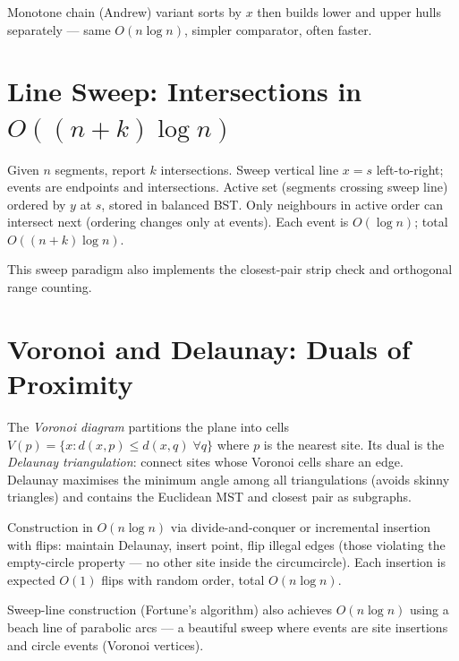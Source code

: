 Monotone chain (Andrew) variant sorts by $x$ then builds lower and upper hulls separately --- same $O(n\log n)$, simpler comparator, often faster.

\section{\texorpdfstring{Line Sweep: Intersections in $O((n+k)\log n)$}{Line Sweep: Intersections in O((n+k) log n)}}
\label{sec:sweep}

Given $n$ segments, report $k$ intersections. Sweep vertical line $x=s$ left-to-right; events are endpoints and intersections. Active set (segments crossing sweep line) ordered by $y$ at $s$, stored in balanced BST. Only neighbours in active order can intersect next (ordering changes only at events). Each event is $O(\log n)$; total $O((n+k)\log n)$.

This sweep paradigm also implements the closest-pair strip check and orthogonal range counting.

\section{Voronoi and Delaunay: Duals of Proximity}
\label{sec:voronoi}

The \emph{Voronoi diagram} partitions the plane into cells $V(p)=\{x: d(x,p)\le d(x,q)\;\forall q\}$ where $p$ is the nearest site. Its dual is the \emph{Delaunay triangulation}: connect sites whose Voronoi cells share an edge. Delaunay maximises the minimum angle among all triangulations (avoids skinny triangles) and contains the Euclidean MST and closest pair as subgraphs.

Construction in $O(n\log n)$ via divide-and-conquer or incremental insertion with flips: maintain Delaunay, insert point, flip illegal edges (those violating the empty-circle property --- no other site inside the circumcircle). Each insertion is expected $O(1)$ flips with random order, total $O(n\log n)$.

\begin{center}
\end{center}
Sweep-line construction (Fortune's algorithm) also achieves $O(n\log n)$ using a beach line of parabolic arcs --- a beautiful sweep where events are site insertions and circle events (Voronoi vertices).

